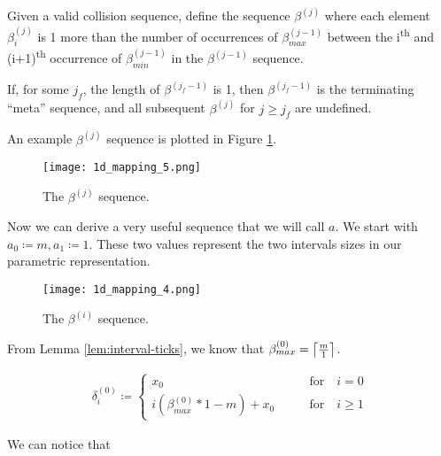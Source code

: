 \begin{definition}
	Given a valid collision sequence, define the sequence $\beta^{(j)}$ where each element $\beta^{(j)}_i$ is 1 more than the number of occurrences of $\beta^{(j-1)}_{max}$ between the i\textsuperscript{th} and (i+1)\textsuperscript{th} occurrence of $\beta^{(j-1)}_{min}$ in the $\beta^{(j-1)}$ sequence.

	If, for some $j_f$, the length of $\beta^{(j_f-1)}$ is 1, then $\beta^{(j_f-1)}$ is the terminating ``meta'' sequence, and all subsequent $\beta^{(j)}$ for $j \ge j_f$ are undefined.
\end{definition}

An example $\beta^{(j)}$ sequence is plotted in Figure \ref{fig:beta-sequence-j}.

\begin{figure}[H]
  \begin{center}
    \texttt{[image: 1d\_mapping\_5.png]}
  \end{center}
  \vspace{-.2in} %
  \caption{\label{fig:beta-sequence-j} The $\beta^{(j)}$ sequence.}
\end{figure}

Now we can derive a very useful sequence that we will call $a$. We start with $a_0 \coloneqq m, a_1 \coloneqq 1$. These two values represent the two intervals sizes in our parametric representation.

\begin{figure}[H]
  \begin{center}
    \texttt{[image: 1d\_mapping\_4.png]}
  \end{center}
  \vspace{-.2in} %
  \caption{\label{fig:a-sequence} The $\beta^{(i)}$ sequence.}
\end{figure}

From Lemma \ref{lem:interval-ticks}, we know that $\beta^{(0)}_{max} = \ceil{\frac{m}{1}}$. 

\begin{align}\label{delta_beta}
	\delta^{(0)}_i \coloneqq \begin{cases}
		x_0 \qquad &\text{for} \quad i = 0\\
		i (\beta^{(0)}_{max} * 1 - m) + x_0 \qquad &\text{for} \quad i \ge 1
	\end{cases}
\end{align}

We can notice that

